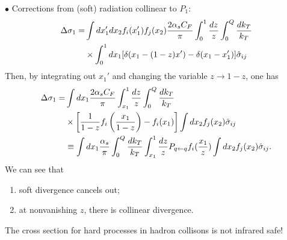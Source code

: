 \documentclass[9pt,a4paper,unknownkeysallowed,xcolor=dvipsnames,aspectratio=43]{beamer}
\begin{document}
\begin{frame}
\vspace{2mm}

{\color{darkred}\Large$\bullet$} Corrections from (soft) radiation collinear to $P_1$:
\begin{align}
    \Delta \sigma_1= &\int dx_1' dx_2 f_i(x_1') f_j(x_2)\frac{2\alpha_s C_F}{\pi}\int_0^1\frac{dz}{z} \int_0^Q\frac{d k_T}{k_T}\notag\\
    &\times\int_0^1 d x_1 [\delta(x_1 - (1-z)x') - \delta(x_1-x_1')]\hat{\sigma}_{ij}
\end{align}
Then, by integrating out $x_1'$ and
changing the variable $z\to 1-z$, one has
\begin{align}
    \Delta \sigma_1= &\int dx_1 \frac{2\alpha_s C_F}{\pi}\int_{x_1}^1\frac{dz}{z} \int_0^Q\frac{d k_T}{k_T}\notag\\
    &\times \left[\frac{1}{1-z} f_i\left(\frac{x_1}{1-z}\right) - f_i(x_1)\right]\int dx_2  f_j(x_2)\hat{\sigma}_{ij}\notag\\    &\equiv \int dx_1 \frac{\alpha_s }{\pi}\int_0^Q\frac{d k_T}{k_T}\int_{x_1}^1\frac{dz}{z}P_{q\leftarrow q} f_i(\frac{x_1}{z})\int dx_2  f_j(x_2)\hat{\sigma}_{ij}.
\end{align}
We can see that
\begin{enumerate}
    \item {soft divergence cancels out;}
    \item at nonvanishing $z$, {there is collinear divergence.}
\end{enumerate}
{\color{darkred}The cross section for hard processes in hadron collisons is not infrared safe!}
\end{frame}
%
%
\end{document}
